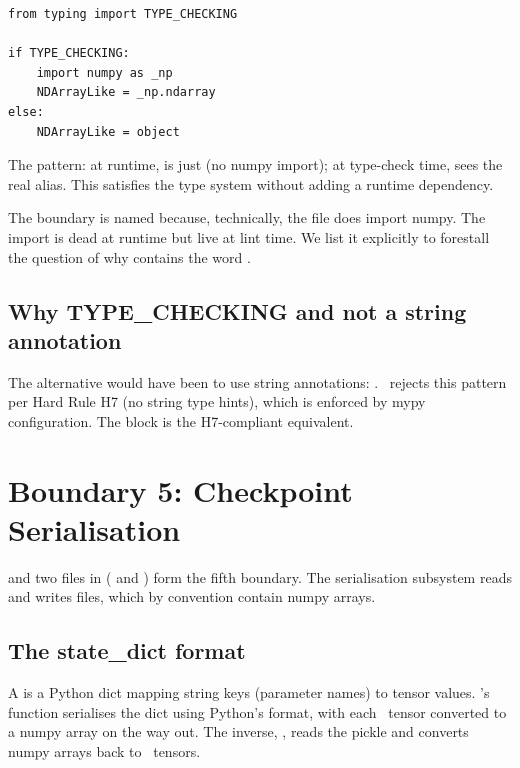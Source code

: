 \begin{lstlisting}[style=lucid,language=LucidPython]
from typing import TYPE_CHECKING

if TYPE_CHECKING:
    import numpy as _np
    NDArrayLike = _np.ndarray
else:
    NDArrayLike = object
\end{lstlisting}

The pattern: at runtime,  is just 
(no numpy import); at type-check time,  sees the real
 alias. This satisfies the type system without
adding a runtime dependency.

The boundary is named because, technically, the file does import
numpy. The import is dead at runtime but live at lint time. We list
it explicitly to forestall the question of why 
contains the word .

\subsection{Why TYPE\_CHECKING and not a string annotation}
\label{ssec:bridge_boundaries:typing_string}

The alternative would have been to use string annotations:
. \Lucid\ rejects this pattern
per Hard Rule H7 (no string type hints), which is enforced by mypy
 configuration. The  block is
the H7-compliant equivalent.

\section{Boundary 5: Checkpoint Serialisation}
\label{sec:bridge_boundaries:b5}

 and two files in 
( and ) form the fifth boundary.
The serialisation subsystem reads and writes 
files, which by convention contain numpy arrays.

\subsection{The state\_dict format}
\label{ssec:bridge_boundaries:state_dict}

A  is a Python dict mapping string keys
(parameter names) to tensor values. \Lucid's  function
serialises the dict using Python's  format, with each
\Lucid\ tensor converted to a numpy array on the way out. The
inverse, , reads the pickle and converts numpy arrays
back to \Lucid\ tensors.

